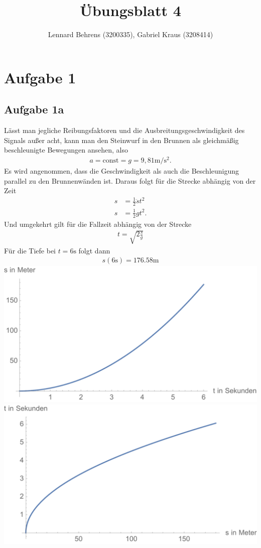 \documentclass[a4paper,10pt]{extarticle}
\title{Übungsblatt 4}
\author{Lennard Behrens (3200335), Gabriel Kraus (3208414)}
\begin{document}
\maketitle

\section{Aufgabe 1}
\subsection*{Aufgabe 1a}
Lässt man jegliche Reibungsfaktoren und die Ausbreitungsgeschwindigkeit des Signals außer acht, kann man den Steinwurf in den Brunnen als gleichmäßig beschleunigte Bewegungen ansehen, also
\begin{align*}
  a = \mbox{const} = g = 9,81 \mbox{m}/\mbox{s}^2 \mbox{.}
\end{align*}
Es wird angenommen, dass die Geschwindigkeit als auch die Beschleunigung parallel zu den Brunnenwänden ist. Daraus folgt für die Strecke abhängig von der Zeit
\begin{align*}
  s &= \frac{1}{2}\ddot{s}t^2\\
  s &= \frac{1}{2}gt^2 \mbox{.}
\end{align*}
Und umgekehrt gilt für die Fallzeit abhängig von der Strecke
\begin{align*}
  t = \sqrt{2\frac{s}{g}}
\end{align*}
Für die Tiefe bei $t=6\mbox{s}$ folgt dann
\begin{align*}
  s(6\mbox{s}) = 176.58\mbox{m}
\end{align*}
\includegraphics[scale=0.5]{./Abbildungen/Abbildung_01.pdf}
\includegraphics[scale=0.5]{./Abbildungen/Abbildung_02.pdf}
\end{document}
